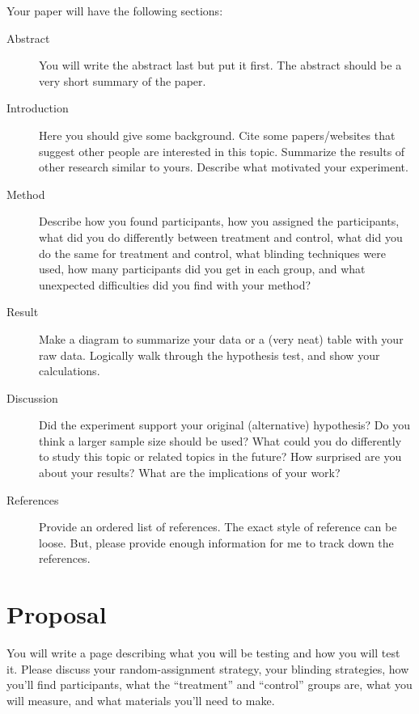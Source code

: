 \documentclass[12pt,letterpaper]{article}
\begin{document}
Your paper will have the following sections:
\begin{description}
\item[Abstract] You will write the abstract last but put it first. The abstract should be a very short summary of the paper.
\item[Introduction] Here you should give some background. Cite some papers/websites that suggest other people are interested in this topic. Summarize the results of other research similar to yours. Describe what motivated your experiment.
\item[Method] Describe how you found participants, how you assigned the participants, what did you do differently between treatment and control, what did you do the same for treatment and control, what blinding techniques were used, how many participants did you get in each group, and what unexpected difficulties did you find with your method?
\item[Result] Make a diagram to summarize your data or a (very neat) table with your raw data. Logically walk through the hypothesis test, and show your calculations.
\item[Discussion] Did the experiment support your original (alternative) hypothesis? Do you think a larger sample size should be used? What could you do differently to study this topic or related topics in the future? How surprised are you about your results? What are the implications of your work?
\item[References] Provide an ordered list of references. The exact style of reference can be loose. But, please provide enough information for me to track down the references. 
\end{description}

\section*{Proposal}
You will write a page describing what you will be testing and how you will test it. Please discuss your random-assignment strategy, your blinding strategies, how you'll find participants, what the ``treatment'' and ``control'' groups are, what you will measure, and what materials you'll need to make.

\newpage
\end{document}
